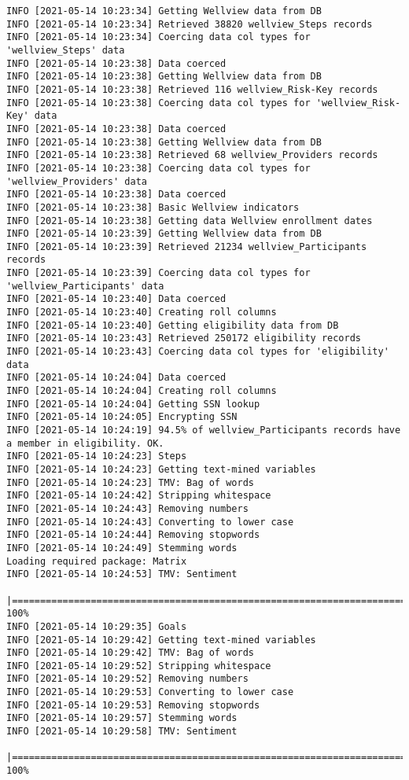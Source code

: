 \documentclass[
]{book}
\begin{document}
\begin{verbatim}
INFO [2021-05-14 10:23:34] Getting Wellview data from DB
INFO [2021-05-14 10:23:34] Retrieved 38820 wellview_Steps records
INFO [2021-05-14 10:23:34] Coercing data col types for 'wellview_Steps' data
INFO [2021-05-14 10:23:38] Data coerced
INFO [2021-05-14 10:23:38] Getting Wellview data from DB
INFO [2021-05-14 10:23:38] Retrieved 116 wellview_Risk-Key records
INFO [2021-05-14 10:23:38] Coercing data col types for 'wellview_Risk-Key' data
INFO [2021-05-14 10:23:38] Data coerced
INFO [2021-05-14 10:23:38] Getting Wellview data from DB
INFO [2021-05-14 10:23:38] Retrieved 68 wellview_Providers records
INFO [2021-05-14 10:23:38] Coercing data col types for 'wellview_Providers' data
INFO [2021-05-14 10:23:38] Data coerced
INFO [2021-05-14 10:23:38] Basic Wellview indicators
INFO [2021-05-14 10:23:38] Getting data Wellview enrollment dates
INFO [2021-05-14 10:23:39] Getting Wellview data from DB
INFO [2021-05-14 10:23:39] Retrieved 21234 wellview_Participants records
INFO [2021-05-14 10:23:39] Coercing data col types for 'wellview_Participants' data
INFO [2021-05-14 10:23:40] Data coerced
INFO [2021-05-14 10:23:40] Creating roll columns
INFO [2021-05-14 10:23:40] Getting eligibility data from DB
INFO [2021-05-14 10:23:43] Retrieved 250172 eligibility records
INFO [2021-05-14 10:23:43] Coercing data col types for 'eligibility' data
INFO [2021-05-14 10:24:04] Data coerced
INFO [2021-05-14 10:24:04] Creating roll columns
INFO [2021-05-14 10:24:04] Getting SSN lookup
INFO [2021-05-14 10:24:05] Encrypting SSN
INFO [2021-05-14 10:24:19] 94.5% of wellview_Participants records have a member in eligibility. OK.
INFO [2021-05-14 10:24:23] Steps
INFO [2021-05-14 10:24:23] Getting text-mined variables
INFO [2021-05-14 10:24:23] TMV: Bag of words
INFO [2021-05-14 10:24:42] Stripping whitespace
INFO [2021-05-14 10:24:43] Removing numbers
INFO [2021-05-14 10:24:43] Converting to lower case
INFO [2021-05-14 10:24:44] Removing stopwords
INFO [2021-05-14 10:24:49] Stemming words
Loading required package: Matrix
INFO [2021-05-14 10:24:53] TMV: Sentiment
  |===============================================================================================================| 100%
INFO [2021-05-14 10:29:35] Goals
INFO [2021-05-14 10:29:42] Getting text-mined variables
INFO [2021-05-14 10:29:42] TMV: Bag of words
INFO [2021-05-14 10:29:52] Stripping whitespace
INFO [2021-05-14 10:29:52] Removing numbers
INFO [2021-05-14 10:29:53] Converting to lower case
INFO [2021-05-14 10:29:53] Removing stopwords
INFO [2021-05-14 10:29:57] Stemming words
INFO [2021-05-14 10:29:58] TMV: Sentiment
  |===============================================================================================================| 100%

\end{verbatim}
\end{document}

